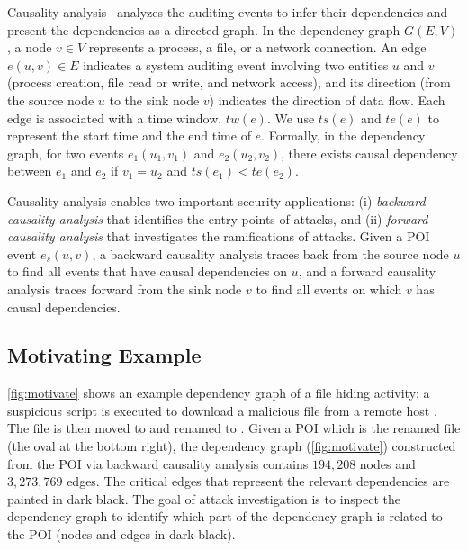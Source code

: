 Causality analysis~\cite{backtracking,backtracking2,taser,intrusionrecovery,liu2018priotracker} analyzes the auditing events to infer their dependencies 
and present the dependencies as a directed graph.
%
In the dependency graph $G(E,V)$, a node $v \in V$ represents a process, a file, or a network connection.
An edge $e(u, v) \in E$ indicates a system auditing event involving two entities $u$ and $v$ (\eg process creation, file read or write, and network access), and its direction (from the source node $u$ to the sink node $v$) indicates the direction of data flow.
Each edge is associated with a time window, $tw(e)$.
We use $ts(e)$ and $te(e)$ to represent the start time and the end time of $e$.
Formally, in the dependency graph, for two events $e_1(u_1, v_1) $ and $e_2(u_2, v_2)$, there exists causal dependency between $e_1$ and $e_2$ if $v_1 = u_2$ and $ts(e_1) < te(e_2)$.

Causality analysis enables two important security applications:
(i) \emph{backward causality analysis} that identifies the entry points of attacks, and (ii) \emph{forward causality analysis} that investigates the ramifications of attacks.
Given a POI event $e_s(u,v)$, a backward causality analysis traces back from the source node $u$ to find all events that have causal dependencies on $u$,
and a forward causality analysis traces forward from the sink node $v$ to find all events on which $v$ has causal dependencies.







\subsection{Motivating Example}
\label{subsec:motivating-example}

\cref{fig:motivate} shows an example dependency graph of a 
file hiding activity: 
a suspicious script  is executed to download a malicious file  from a remote host . The file is then moved to  and renamed to .
%
Given a POI which is the renamed file  (\ie the oval at the bottom right), the dependency graph (\cref{fig:motivate}) constructed from the POI via backward causality analysis 
contains $194,208$ nodes and $3,273,769$ edges.
The critical edges that represent the relevant dependencies are painted in dark black.
%
The goal of attack investigation is to inspect the dependency graph to identify which part of the dependency graph is related to the POI (\ie nodes and edges in dark black).


